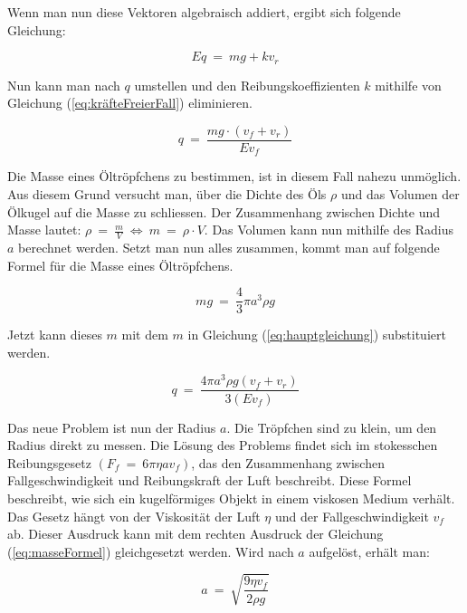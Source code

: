 Wenn man nun diese Vektoren algebraisch addiert, ergibt sich folgende Gleichung:

\begin{equation}\label{eq:elektrischesFeld}
	Eq \ = \ mg + kv_r
\end{equation}

\noindent Nun kann man nach $q$ umstellen und den Reibungskoeffizienten $k$ mithilfe von Gleichung (\ref{eq:kräfteFreierFall}) eliminieren. 

\begin{equation}\label{eq:hauptgleichung}
	q \ = \ \frac{mg \cdot (v_f + v_r)}{Ev_f}
\end{equation}

\noindent Die Masse eines Öltröpfchens zu bestimmen, ist in diesem Fall nahezu unmöglich. Aus diesem Grund versucht man, über die Dichte des Öls $\rho$ und das Volumen der Ölkugel auf die Masse zu schliessen. Der Zusammenhang zwischen Dichte und Masse lautet: $\rho \ = \ \frac{m}{V} \ \Leftrightarrow \ m \ = \ \rho \cdot V$. Das Volumen kann nun mithilfe des Radius $a$ berechnet werden. Setzt man nun alles zusammen, kommt man auf folgende Formel für die Masse eines Öltröpfchens. 

\begin{equation}\label{eq:masseFormel}
	mg \ = \ \frac{4}{3} \pi a^3 \rho g
\end{equation}

\noindent Jetzt kann dieses $m$ mit dem $m$ in Gleichung (\ref{eq:hauptgleichung}) substituiert werden.

\begin{equation}\label{eq:ladungFormel}
	q \ = \ \frac{4\pi a^3\rho g (v_f + v_r)}{3(Ev_f)}
\end{equation}

\noindent Das neue Problem ist nun der Radius $a$. Die Tröpfchen sind zu klein, um den Radius direkt zu messen. Die Lösung des Problems findet sich im stokesschen Reibungsgesetz $(F_f \ = \ 6\pi \eta a v_f)$, das den Zusammenhang zwischen Fallgeschwindigkeit und Reibungskraft der Luft beschreibt. Diese Formel beschreibt, wie sich ein kugelförmiges Objekt in einem viskosen Medium verhält. Das Gesetz hängt von der Viskosität der Luft $\eta$ und der Fallgeschwindigkeit $v_f$ ab. Dieser Ausdruck kann mit dem rechten Ausdruck der Gleichung (\ref{eq:masseFormel}) gleichgesetzt werden. Wird nach $a$ aufgelöst, erhält man:

\begin{equation}\label{eq:stokesRadius}
	a \ = \ \sqrt{\frac{9\eta v_f}{2\rho g}}
\end{equation}

